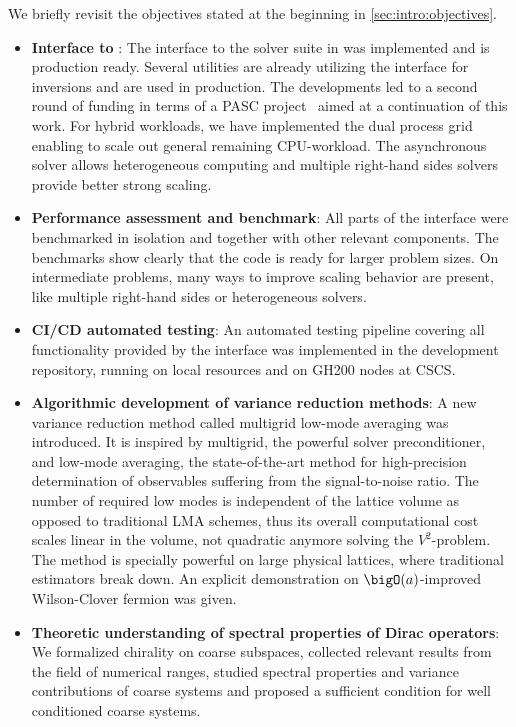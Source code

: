We briefly revisit the objectives stated at the beginning in \cref{sec:intro:objectives}.
\begin{itemize}
   \item \textbf{Interface to \quda}: The interface to the solver suite in \quda was implemented and is production ready. Several utilities are already utilizing the interface for inversions and are used in production. The developments led to a second round of funding in terms of a PASC project~\cite{online:pasc2025} aimed at a continuation of this work. For hybrid workloads, we have implemented the dual process grid enabling to scale out general remaining CPU-workload. The asynchronous solver allows heterogeneous computing and multiple right-hand sides solvers provide better strong scaling.
   \item \textbf{Performance assessment and benchmark}: All parts of the interface were benchmarked in isolation and together with other relevant components. The benchmarks show clearly that the code is ready for larger problem sizes. On intermediate problems, many ways to improve scaling behavior are present, like multiple right-hand sides or heterogeneous solvers.
   \item \textbf{CI/CD automated testing}: An automated testing pipeline covering all functionality provided by the interface was implemented in the development repository, running on local resources and on GH200 nodes at CSCS.
   \item \textbf{Algorithmic development of variance reduction methods}: A new variance reduction method called multigrid low-mode averaging was introduced. It is inspired by multigrid, the powerful solver preconditioner, and low-mode averaging, the state-of-the-art method for high-precision determination of observables suffering from the signal-to-noise ratio. The number of required low modes is independent of the lattice volume as opposed to traditional LMA schemes, thus its overall computational cost scales linear in the volume, not quadratic anymore solving the $V^{2}$-problem. The method is specially powerful on large physical lattices, where traditional estimators break down. An explicit demonstration on $\bigO(a)$-improved Wilson-Clover fermion was given.
   \item \textbf{Theoretic understanding of spectral properties of Dirac operators}: We formalized chirality on coarse subspaces, collected relevant results from the field of numerical ranges, studied spectral properties and variance contributions of coarse systems and proposed a sufficient condition for well conditioned coarse systems.
\end{itemize}

